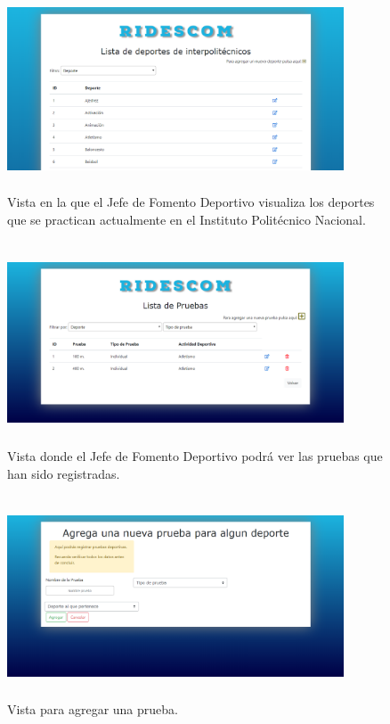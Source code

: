 		\begin{figure} [hbt!]
			\centering
			\includegraphics[width=10cm, height=6cm]{Imagenes/Vistas/Vista7_DeportesJFD}
			\caption{Vista en la que el Jefe de Fomento Deportivo visualiza los deportes que se practican actualmente en el Instituto Politécnico Nacional.}
			\label{VistaDeportes}
		\end{figure}
		
		\begin{figure} [hbt!]
			\centering
			\includegraphics[width=10cm, height=6cm]{Imagenes/Vistas/Vista8_PruebaJFD}
			\caption{Vista donde el Jefe de Fomento Deportivo podrá ver las pruebas que han sido registradas.}
			\label{VistaPruebas}
		\end{figure}
	
		\begin{figure}
			\centering
			\includegraphics[width=10cm, height=6cm]{Imagenes/Vistas/Vista20_AgregaPrueba}
			\caption{Vista para agregar una prueba.}
			\label{VistaAgregaPrueba}
		\end{figure}
		

